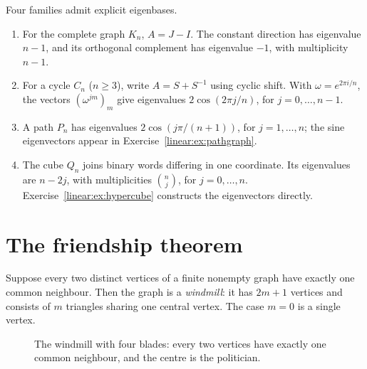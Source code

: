 \begin{example}\label{linear:exa:spectra}
Four families admit explicit eigenbases.
\begin{enumerate}[label=(\alph*)]
\item For the complete graph $K_n$, $A=J-I$. The constant direction has eigenvalue $n-1$, and its orthogonal complement has eigenvalue $-1$, with multiplicity $n-1$.
\item For a cycle $C_n$ ($n\ge3$), write $A=S+S^{-1}$ using cyclic shift. With $\omega=e^{2\pi i/n}$, the vectors $(\omega^{jm})_m$ give eigenvalues $2\cos(2\pi j/n)$, for $j=0,\ldots,n-1$.
\item A path $P_n$ has eigenvalues $2\cos(j\pi/(n+1))$, for $j=1,\ldots,n$; the sine eigenvectors appear in Exercise~\ref{linear:ex:pathgraph}.
\item The cube $Q_n$ joins binary words differing in one coordinate. Its eigenvalues are $n-2j$, with multiplicities $\binom nj$, for $j=0,\ldots,n$. Exercise~\ref{linear:ex:hypercube} constructs the eigenvectors directly.
\end{enumerate}
\end{example}

\section{The friendship theorem}

\begin{theorem}\label{linear:thm:friendship}
Suppose every two distinct vertices of a finite nonempty graph have exactly one common neighbour. Then the graph is a \emph{windmill}: it has $2m+1$ vertices and consists of $m$ triangles sharing one central vertex. The case $m=0$ is a single vertex.
\end{theorem}

\begin{figure}[ht]
\centering
{}
\caption{The windmill with four blades: every two vertices have exactly one common neighbour, and the centre is the
politician.}
\label{linear:fig:windmill}
\end{figure}

